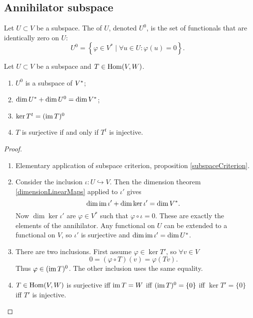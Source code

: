 \subsection{Annihilator subspace}
\begin{definition}
Let $U\subset V$ be a subspace. The  of $U$, denoted $U^0$, is the set of functionals that are identically zero on $U$:
\[ U^0 = \left\{ \varphi\in V^*\;|\; \forall u\in U:\varphi(u) = 0 \right\}. \]
\end{definition}
\begin{proposition} \label{annihilatorSpace}
Let $U\subset V$ be a subspace and $T\in \operatorname{Hom}(V,W)$.
\begin{enumerate}
\item $U^0$ is a subspace of ${V}^*$;
\item $\dim {U}^* + \dim U^0 = \dim {V}^*$;
\item $\ker T^t = (\operatorname{im} T)^0$
\item $T$ is surjective \textup{if and only if} $T^t$ is injective.
\end{enumerate}
\end{proposition}
\begin{proof}
\mbox{}
\begin{enumerate}
\item Elementary application of subspace criterion, proposition \ref{subspaceCriterion}.
\item Consider the inclusion $\iota: U\hookrightarrow V$. Then the dimension theorem \ref{dimensionLinearMaps} applied to $\iota'$ gives
\[ \dim \operatorname{im} \iota' + \dim \ker\iota' = \dim V^*. \]
Now $\dim \ker\iota'$ are $\varphi\in V^*$ such that $\varphi \circ \iota = 0$. These are exactly the elements of the annihilator. Any functional on $U$ can be extended to a functional on $V$, so $\iota'$ is surjective and $\dim \operatorname{im} \iota' = \dim U^*$.
\item There are two inclusions. First assume $\varphi \in \ker T'$, so $\forall v\in V$
\[ 0 = (\varphi\circ T)(v) = \varphi(Tv). \]
Thus $\varphi\in(\operatorname{im} T)^0$. The other inclusion uses the same equality.
\item $T\in\operatorname{Hom}(V,W)$ is surjective iff $\operatorname{im} T = W$ iff $(\operatorname{im} T)^0 = \{0\}$ iff $\ker T' = \{0\}$ iff $T'$ is injective.
\end{enumerate}
\end{proof}



